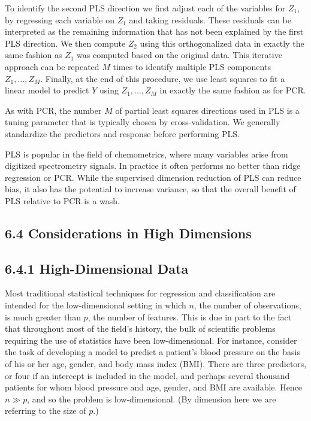 \documentclass[10pt]{article}
\begin{document}
To identify the second PLS direction we first adjust each of the variables for $Z_{1}$, by regressing each variable on $Z_{1}$ and taking residuals. These residuals can be interpreted as the remaining information that has not been explained by the first PLS direction. We then compute $Z_{2}$ using this orthogonalized data in exactly the same fashion as $Z_{1}$ was computed based on the original data. This iterative approach can be repeated $M$ times to identify multiple PLS components $Z_{1}, \ldots, Z_{M}$. Finally, at the end of this procedure, we use least squares to fit a linear model to predict $Y$ using $Z_{1}, \ldots, Z_{M}$ in exactly the same fashion as for PCR.

As with PCR, the number $M$ of partial least squares directions used in PLS is a tuning parameter that is typically chosen by cross-validation. We generally standardize the predictors and response before performing PLS.

PLS is popular in the field of chemometrics, where many variables arise from digitized spectrometry signals. In practice it often performs no better than ridge regression or PCR. While the supervised dimension reduction of PLS can reduce bias, it also has the potential to increase variance, so that the overall benefit of PLS relative to PCR is a wash.

\subsection*{6.4 Considerations in High Dimensions}
\subsection*{6.4.1 High-Dimensional Data}
Most traditional statistical techniques for regression and classification are intended for the low-dimensional setting in which $n$, the number of observations, is much greater than $p$, the number of features. This is due in part to the fact that throughout most of the field's history, the bulk of scientific problems requiring the use of statistics have been low-dimensional. For instance, consider the task of developing a model to predict a patient's blood pressure on the basis of his or her age, gender, and body mass index (BMI). There are three predictors, or four if an intercept is included in the model, and perhaps several thousand patients for whom blood pressure and age, gender, and BMI are available. Hence $n \gg p$, and so the problem is low-dimensional. (By dimension here we are referring to the size of $p$.)
\end{document}
